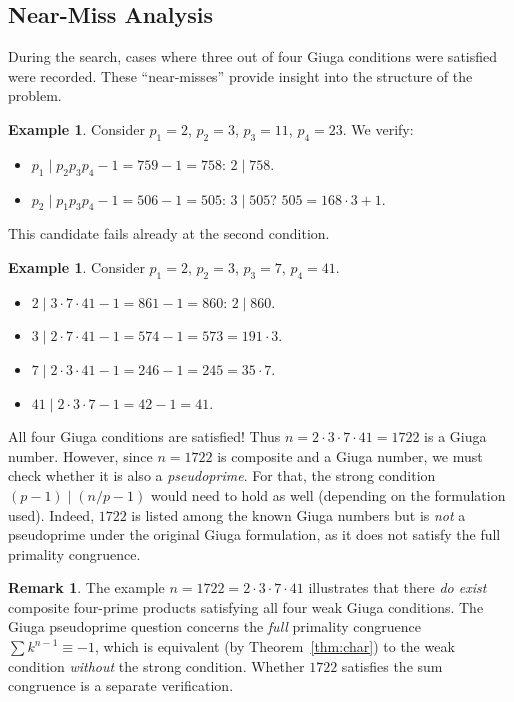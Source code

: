 \documentclass[12pt,a4paper]{amsart}
\theoremstyle{definition}
\newtheorem{example}[theorem]{Example}
\newtheorem{remark}[theorem]{Remark}
\begin{document}
\subsection{Near-Miss Analysis}

During the search, cases where three out of four Giuga conditions were
satisfied were recorded.  These ``near-misses'' provide insight into the
structure of the problem.

\begin{example}
Consider $p_1 = 2$, $p_2 = 3$, $p_3 = 11$, $p_4 = 23$.  We verify:
\begin{itemize}
  \item $p_1 \mid p_2 p_3 p_4 - 1 = 759 - 1 = 758$: $2 \mid 758$. \checkmark
  \item $p_2 \mid p_1 p_3 p_4 - 1 = 506 - 1 = 505$: $3 \mid 505$? $505 = 168 \cdot 3 + 1$. \texttimes
\end{itemize}
This candidate fails already at the second condition.
\end{example}

\begin{example}
Consider $p_1 = 2$, $p_2 = 3$, $p_3 = 7$, $p_4 = 41$.
\begin{itemize}
  \item $2 \mid 3 \cdot 7 \cdot 41 - 1 = 861 - 1 = 860$: $2 \mid 860$. \checkmark
  \item $3 \mid 2 \cdot 7 \cdot 41 - 1 = 574 - 1 = 573 = 191 \cdot 3$. \checkmark
  \item $7 \mid 2 \cdot 3 \cdot 41 - 1 = 246 - 1 = 245 = 35 \cdot 7$. \checkmark
  \item $41 \mid 2 \cdot 3 \cdot 7 - 1 = 42 - 1 = 41$. \checkmark
\end{itemize}
All four Giuga conditions are satisfied!  Thus $n = 2 \cdot 3 \cdot 7 \cdot 41
= 1722$ is a Giuga number.  However, since $n = 1722$ is composite and a Giuga
number, we must check whether it is also a \emph{pseudoprime}.  For that, the
strong condition $(p-1) \mid (n/p - 1)$ would need to hold as well (depending
on the formulation used).  Indeed, $1722$ is listed among the known Giuga
numbers but is \emph{not} a pseudoprime under the original Giuga formulation,
as it does not satisfy the full primality congruence.
\end{example}

\begin{remark}
The example $n = 1722 = 2 \cdot 3 \cdot 7 \cdot 41$ illustrates that there
\emph{do exist} composite four-prime products satisfying all four weak Giuga
conditions.  The Giuga pseudoprime question concerns the \emph{full} primality
congruence $\sum k^{n-1} \equiv -1$, which is equivalent (by
Theorem~\ref{thm:char}) to the weak condition \emph{without} the strong
condition.  Whether $1722$ satisfies the sum congruence is a separate
verification.
\end{remark}
\end{document}
